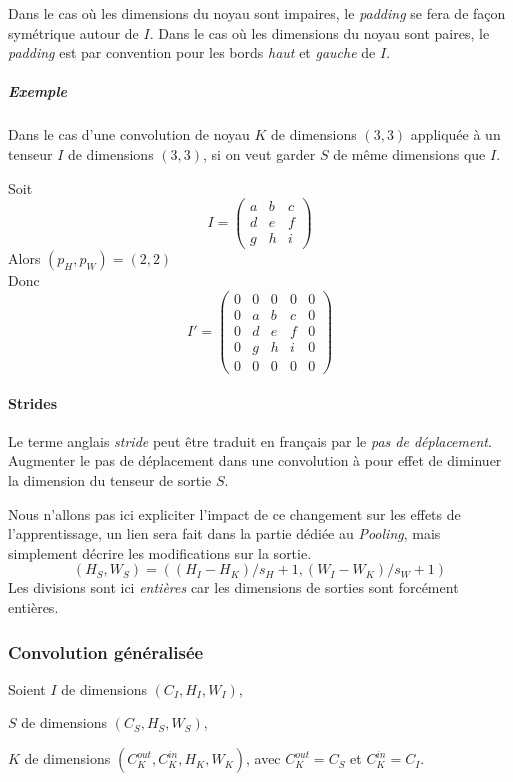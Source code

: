 \documentclass[a4paper, 11pt]{report}
\begin{document}
Dans le cas où les dimensions du noyau sont impaires, le \emph{padding} se fera de façon symétrique autour de $I$.
Dans le cas où les dimensions du noyau sont paires, le \emph{padding} est par convention pour les bords \emph{haut} et \emph{gauche} de $I$.

\subparagraph{Exemple}
Dans le cas d'une convolution de noyau $K$ de dimensions $(3, 3)$ appliquée à un tenseur $I$ de dimensions $(3,3)$, si on veut garder $S$ de même dimensions que $I$.

Soit
$$I =
\begin{pmatrix}
a & b & c \\ 
d & e & f \\ 
g & h & i
\end{pmatrix}$$
Alors $(p_H,p_W) = (2, 2)$\\
Donc $$I'=
\begin{pmatrix}
0 & 0 & 0 & 0 & 0\\
0 & a & b & c & 0\\ 
0 & d & e & f & 0\\ 
0 & g & h & i & 0\\
0 & 0 & 0 & 0 & 0
\end{pmatrix}
$$
\paragraph{Strides}
Le terme anglais \emph{stride} peut être traduit en français par le \emph{pas de déplacement}.\\
Augmenter le pas de déplacement dans une convolution à pour effet de diminuer la dimension du tenseur de sortie $S$.

Nous n'allons pas ici expliciter l'impact de ce changement sur les effets de l'apprentissage, un lien sera fait dans la partie dédiée au \emph{Pooling}, mais simplement décrire les modifications sur la sortie.
$$(H_S, W_S) = ((H_I - H_K) / s_H + 1, (W_I - W_K) / s_W + 1)$$
Les divisions sont ici \emph{entières} car les dimensions de sorties sont forcément entières.
\subsubsection{Convolution généralisée}
Soient $I$ de dimensions $(C_I, H_I,W_I)$,

$S$ de dimensions $(C_S, H_S, W_S)$,

$K$ de dimensions $(C_K^{out}, C_K^{in}, H_K, W_K)$, avec $C_K^{out} = C_S$ et $C_K^{in} = C_I$.
\end{document}
